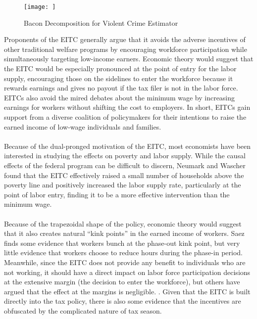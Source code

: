 \documentclass{article}
\begin{document}
 \begin{figure}[H]
    \caption{Bacon Decomposition for Violent Crime Estimator}
    \begin{center}
        \texttt{[image: ]}
    \end{center}
    \label{fig:graph}
\end{figure}

Proponents of the EITC generally argue that it avoids the adverse incentives of other traditional welfare programs by encouraging workforce participation while simultaneously targeting low-income earners. Economic theory would suggest that the EITC would be especially pronounced at the point of entry for the labor supply, encouraging those on the sidelines to enter the workforce because it rewards earnings and gives no payout if the tax filer is not in the labor force. \cite{eissa2006behavioral} EITCs also avoid the mired debates about the minimum wage by increasing earnings for workers without shifting the cost to employers. In short, EITCs gain support from a diverse coalition of policymakers for their intentions to raise the earned income of low-wage individuals and families. \\
\\
Because of the dual-pronged motivation of the EITC, most economists have been interested in studying the effects on poverty and labor supply. While the causal effects of the federal program can be difficult to discern, Neumark and Wascher \cite{neumark2001using} found that the EITC effectively raised a small number of households above the poverty line and positively increased the labor supply rate, particularly at the point of labor entry, finding it to be a more effective intervention than the minimum wage. \\
\\
Because of the trapezoidal shape of the policy, economic theory would suggest that it also creates natural “kink points” in the earned income of workers. Saez \cite{saez2010taxpayers} finds some evidence that workers bunch at the phase-out kink point, but very little evidence that workers choose to reduce hours during the phase-in period. Meanwhile, since the EITC does not provide any benefit to individuals who are not working, it should have a direct impact on labor force participation decisions at the extensive margin (the decision to enter the workforce), but others have argued that the effect at the margins is negligible. \cite{kleven2019eitc}. Given that the EITC is built directly into the tax policy, there is also some evidence that the incentives are obfuscated by the complicated nature of tax season. \cite{chetty2013teaching}
\end{document}
